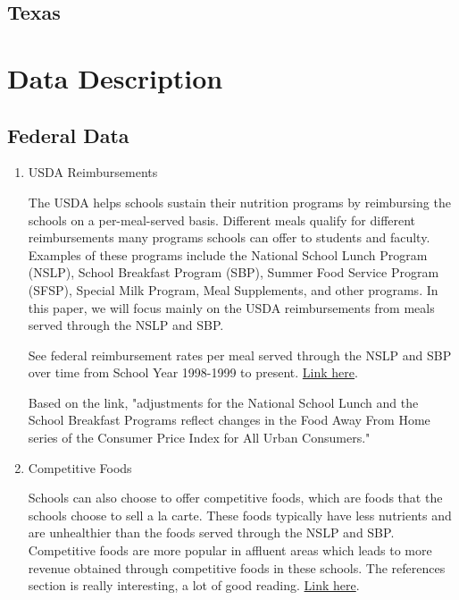 \documentclass[12pt]{article}
\begin{document}
\subsection{Texas}

\section{Data Description}

\subsection{Federal Data}
\begin{enumerate}
	
	\item USDA Reimbursements
	
	The USDA helps schools sustain their nutrition programs by reimbursing the schools on a per-meal-served basis. Different meals qualify for different reimbursements  many programs schools can offer to students and faculty. Examples of these programs include the National School Lunch Program (NSLP), School Breakfast Program (SBP), Summer Food Service Program (SFSP), Special Milk Program, Meal Supplements, and other programs. In this paper, we will focus mainly on the USDA reimbursements from meals served through the NSLP and SBP.
	
	See federal reimbursement rates per meal served through the NSLP and SBP over time from School Year 1998-1999 to present. \href{https://www.fns.usda.gov/cn/rates-reimbursement}{Link here}.
	
	Based on the link, "adjustments for the National School Lunch and the School Breakfast Programs reflect changes in the Food Away From Home series of the Consumer Price Index for All Urban Consumers."
	
	\item Competitive Foods

	Schools can also choose to offer competitive foods, which are foods that the schools choose to sell a la carte. These foods typically have less nutrients and are unhealthier than the foods served through the NSLP and SBP. Competitive foods are more popular in affluent areas which leads to more revenue obtained through competitive foods in these schools. The references section is really interesting, a lot of good reading. \href{https://www.ers.usda.gov/webdocs/publications/43770/38064_eib114.pdf?v=0}{Link here}.%


\end{enumerate}
\end{document}
